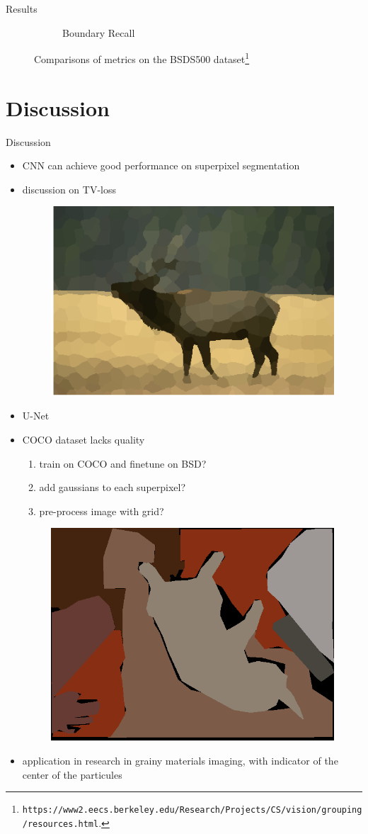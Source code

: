 \documentclass[9pt]{beamer}
\begin{document}
\begin{frame}{Results}
\begin{figure}[!ht]
\begin{subfigure}{.45\linewidth}
    \caption{Boundary Recall}
    \end{subfigure}
    \caption{Comparisons of metrics on the BSDS500 dataset\footnote{\texttt{https://www2.eecs.berkeley.edu/Research/Projects/CS/vision/grouping/resources.html}.}}
\end{figure}
\end{frame}

\section{Discussion}
\begin{frame}{Discussion}
\begin{itemize}
    \item CNN can achieve good performance on superpixel segmentation
    \item discussion on TV-loss
        \begin{figure}
        \centering
        \includegraphics[width=.3\textwidth]{pics/illustration1.png}
        \end{figure}
    \item U-Net
    \item COCO dataset lacks quality
        \begin{enumerate}
            \item train on COCO and finetune on BSD?
            \item add gaussians to each superpixel?
            \item pre-process image with grid?
        \end{enumerate}
        \begin{figure}
        \centering
        \includegraphics[width=.2\textwidth]{pics/img_segm_coco.png}
        \end{figure}
    \item application in research in grainy materials imaging, with indicator of the center of the particules
\end{itemize}
\end{frame}
\end{document}
